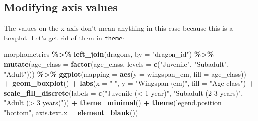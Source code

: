 \documentclass[
]{book}
\newenvironment{Shaded}{\begin{snugshade}}{\end{snugshade}}
\newcommand{\AttributeTok}[1]{\textcolor[rgb]{0.13,0.29,0.53}{#1}}
\newcommand{\FunctionTok}[1]{\textcolor[rgb]{0.13,0.29,0.53}{\textbf{#1}}}
\newcommand{\NormalTok}[1]{#1}
\newcommand{\SpecialCharTok}[1]{\textcolor[rgb]{0.81,0.36,0.00}{\textbf{#1}}}
\newcommand{\StringTok}[1]{\textcolor[rgb]{0.31,0.60,0.02}{#1}}
\begin{document}
\hypertarget{modifying-axis-values}{%
\subsection{Modifying axis values}\label{modifying-axis-values}}

The values on the x axis don't mean anything in this case because this is a
boxplot. Let's get rid of them in \texttt{theme}:

\begin{Shaded}
\begin{Highlighting}[]
\NormalTok{morphometrics }\SpecialCharTok{\%\textgreater{}\%} 
  \FunctionTok{left\_join}\NormalTok{(dragons, }\AttributeTok{by =} \StringTok{"dragon\_id"}\NormalTok{) }\SpecialCharTok{\%\textgreater{}\%} 
  \FunctionTok{mutate}\NormalTok{(}\AttributeTok{age\_class =} \FunctionTok{factor}\NormalTok{(age\_class, }\AttributeTok{levels =} \FunctionTok{c}\NormalTok{(}\StringTok{"Juvenile"}\NormalTok{,}
                                                  \StringTok{"Subadult"}\NormalTok{,}
                                                  \StringTok{"Adult"}\NormalTok{))) }\SpecialCharTok{\%\textgreater{}\%} 
\FunctionTok{ggplot}\NormalTok{(}\AttributeTok{mapping =} \FunctionTok{aes}\NormalTok{(}\AttributeTok{y =}\NormalTok{ wingspan\_cm, }\AttributeTok{fill =}\NormalTok{ age\_class)) }\SpecialCharTok{+}
  \FunctionTok{geom\_boxplot}\NormalTok{() }\SpecialCharTok{+}
  \FunctionTok{labs}\NormalTok{(}\AttributeTok{x =} \StringTok{" "}\NormalTok{, }\AttributeTok{y =} \StringTok{"Wingspan (cm)"}\NormalTok{, }\AttributeTok{fill =} \StringTok{"Age class"}\NormalTok{) }\SpecialCharTok{+}
  \FunctionTok{scale\_fill\_discrete}\NormalTok{(}\AttributeTok{labels =} \FunctionTok{c}\NormalTok{(}\StringTok{"Juvenile (\textless{} 1 year)"}\NormalTok{,}
                                 \StringTok{"Subadult (2{-}3 years)"}\NormalTok{,}
                                 \StringTok{"Adult (\textgreater{} 3 years)"}\NormalTok{)) }\SpecialCharTok{+}
  \FunctionTok{theme\_minimal}\NormalTok{() }\SpecialCharTok{+}
  \FunctionTok{theme}\NormalTok{(}\AttributeTok{legend.position =} \StringTok{"bottom"}\NormalTok{,}
        \AttributeTok{axis.text.x =} \FunctionTok{element\_blank}\NormalTok{()) }
\end{Highlighting}
\end{Shaded}
\end{document}
